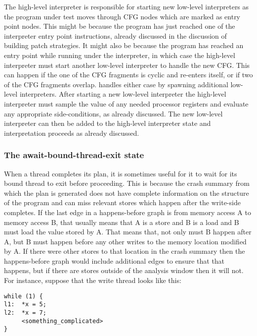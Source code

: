 The high-level interpreter is responsible for starting new low-level
interpreters as the program under test moves through CFG nodes which
are marked as entry point nodes.  This might be because the program
has just reached one of the interpreter entry point instructions,
already discussed in the discussion of building patch strategies.  It
might also be because the program has reached an entry point while
running under the interpreter, in which case the high-level
interpreter must start another low-level interpreter to handle the new
CFG.  This can happen if the one of the CFG fragments is
cyclic and re-enters itself, or if two of the CFG fragments
overlap.  {\Implementation} handles either case by spawning additional
low-level interpreters.  After starting a new low-level interpreter
the high-level interpreter must sample the value of any needed
processor registers and evaluate any appropriate side-conditions, as
already discussed.  The new low-level interpreter can then be added to
the high-level interpreter state and interpretation proceeds as
already discussed.

\subsubsection{The await-bound-thread-exit state}

When a thread completes its plan, it is sometimes useful for it to
wait for its bound thread to exit before proceeding.  This is because
the crash summary from which the plan is generated does not have
complete information on the structure of the program and can miss
relevant stores which happen after the write-side {\StateMachine}
completes.  If the last edge in a happens-before graph is from memory
access A to memory access B, that usually means that A is a store and
B is a load and B must load the value stored by A.  That means that,
not only must B happen after A, but B must happen before any other
writes to the memory location modified by A.  If there were other
stores to that location in the crash summary then the happens-before
graph would include additional edges to ensure that that happens, but
if there are stores outside of the analysis window then it will not.
For instance, suppose that the write thread looks like this:

\begin{verbatim}
while (1) {
l1:  *x = 5;
l2:  *x = 7;
     <something_complicated>
}
\end{verbatim}


